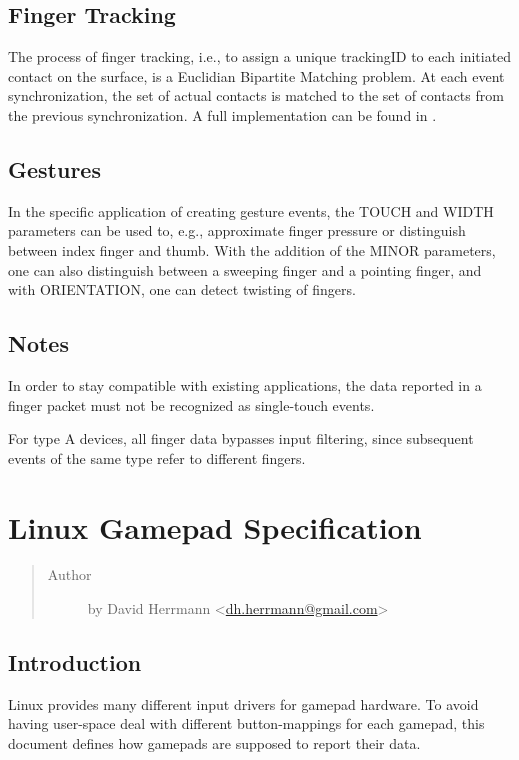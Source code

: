 \documentclass[a4paper,8pt,english]{sphinxmanual}
\begin{document}
\subsection{Finger Tracking}
\label{input/multi-touch-protocol:finger-tracking}
The process of finger tracking, i.e., to assign a unique trackingID to each
initiated contact on the surface, is a Euclidian Bipartite Matching
problem.  At each event synchronization, the set of actual contacts is
matched to the set of contacts from the previous synchronization. A full
implementation can be found in \footnotemark[3].


\subsection{Gestures}
\label{input/multi-touch-protocol:gestures}
In the specific application of creating gesture events, the TOUCH and WIDTH
parameters can be used to, e.g., approximate finger pressure or distinguish
between index finger and thumb. With the addition of the MINOR parameters,
one can also distinguish between a sweeping finger and a pointing finger,
and with ORIENTATION, one can detect twisting of fingers.


\subsection{Notes}
\label{input/multi-touch-protocol:notes}
In order to stay compatible with existing applications, the data reported
in a finger packet must not be recognized as single-touch events.

For type A devices, all finger data bypasses input filtering, since
subsequent events of the same type refer to different fingers.


\section{Linux Gamepad Specification}
\label{input/gamepad::doc}\label{input/gamepad:linux-gamepad-specification}\begin{quote}\begin{description}
\item[{Author}]  by David Herrmann \textless{}\href{mailto:dh.herrmann@gmail.com}{dh.herrmann@gmail.com}\textgreater{}

\end{description}\end{quote}


\subsection{Introduction}
\label{input/gamepad:introduction}
Linux provides many different input drivers for gamepad hardware. To avoid
having user-space deal with different button-mappings for each gamepad, this
document defines how gamepads are supposed to report their data.
\end{document}
